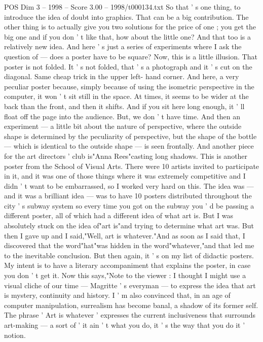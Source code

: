 \begin{textsample}{POS Dim 3 – 1998 – Score 3.00 – 1998/t000134.txt}
So that ' s one thing, to introduce the idea of doubt into graphics.
That can be a big contribution.
The other thing is to actually give you two solutions for the price of one ; you get the big one and if you don ' t like that, how about the little one?
And that too is a relatively new idea.
And here ' s just a series of experiments where I ask the question of — does a poster have to be square?
Now, this is a little illusion.
That poster is not folded.
It ' s not folded, that ' s a photograph and it ' s cut on the diagonal.
Same cheap trick in the upper left- hand corner.
And here, a very peculiar poster because, simply because of using the isometric perspective in the computer, it won ' t sit still in the space.
At times, it seems to be wider at the back than the front, and then it shifts.
And if you sit here long enough, it ' ll float off the page into the audience.
But, we don ' t have time.
And then an experiment — a little bit about the nature of perspective, where the outside shape is determined by the peculiarity of perspective, but the shape of the bottle — which is identical to the outside shape — is seen frontally.
And another piece for the art directors ' club is"Anna Rees"casting long shadows.
This is another poster from the School of Visual Arts.
There were 10 artists invited to participate in it, and it was one of those things where it was extremely competitive and I didn ' t want to be embarrassed, so I worked very hard on this.
The idea was — and it was a brilliant idea — was to have 10 posters distributed throughout the city ' s subway system so every time you got on the subway you ' d be passing a different poster, all of which had a different idea of what art is.
But I was absolutely stuck on the idea of"art is"and trying to determine what art was.
But then I gave up and I said,"Well, art is whatever."And as soon as I said that, I discovered that the word"hat"was hidden in the word"whatever,"and that led me to the inevitable conclusion.
But then again, it ' s on my list of didactic posters.
My intent is to have a literary accompaniment that explains the poster, in case you don ' t get it.
Now this says,"Note to the viewer : I thought I might use a visual cliche of our time — Magritte ' s everyman — to express the idea that art is mystery, continuity and history.
I ' m also convinced that, in an age of computer manipulation, surrealism has become banal, a shadow of its former self.
The phrase ' Art is whatever ' expresses the current inclusiveness that surrounds art-making — a sort of ' it ain ' t what you do, it ' s the way that you do it ' notion.

\end{textsample}
